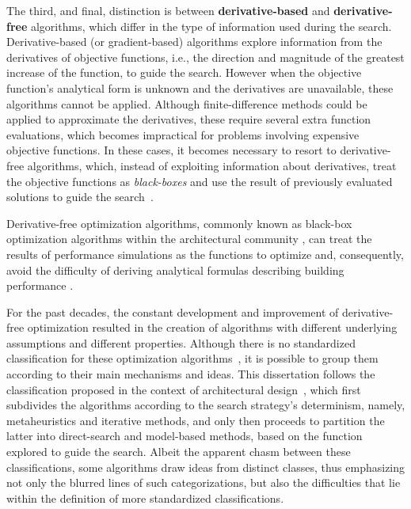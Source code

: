 	The third, and final, distinction is between \textbf{derivative-based} and \textbf{derivative-free} algorithms, which differ in the type of information used during the search. Derivative-based (or gradient-based) algorithms explore information from the derivatives of objective functions, i.e., the direction and magnitude of the greatest increase of the function, to guide the search. %
	However when the objective function's analytical form is unknown and the derivatives are unavailable, these algorithms cannot be applied. Although finite-difference methods could be applied to approximate the derivatives, these require several extra function evaluations, which becomes impractical for problems involving expensive objective functions. In these cases, it becomes necessary to resort to derivative-free algorithms, which, instead of exploiting information about derivatives, treat the objective functions as \textit{black-boxes} and use the result of previously evaluated solutions to guide the search~\cite{Rios2013}.
	
	Derivative-free optimization algorithms, commonly known as black-box optimization algorithms within the architectural community \cite{Wortmann2016BBO},
	can treat the results of performance simulations as the functions to optimize and, consequently, avoid the difficulty of deriving analytical formulas describing building performance \cite{Machairas2014}.
	
	For the past decades, the constant development and improvement of derivative-free optimization resulted in the creation of algorithms with different underlying assumptions and different properties. Although there is no standardized classification for these optimization algorithms~\cite{Rios2013, Wortmann2017ADO}, it is possible to group them according to their main mechanisms and ideas. This dissertation follows the classification proposed in the context of architectural design~\cite{Wortmann2015AdvSBO}, which first subdivides the algorithms according to the search strategy's determinism, namely, metaheuristics and iterative methods, and only then proceeds to partition the latter into direct-search and model-based methods, based on the function explored to guide the search. Albeit the apparent chasm between these classifications, some algorithms draw ideas from distinct classes, thus emphasizing not only the blurred lines of such categorizations, but also the difficulties that lie within the definition of more standardized classifications. 
	
